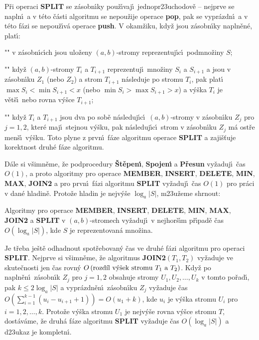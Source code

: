 \flushpar P\v ri operaci {\bf SPLIT} se z\'asobn\'\i ky pou\v z\'\i vaj\'\i\ 
jednopr\accent23uchodov\v e -- nejprve se napln\'\i\ a v t\'eto \v c\'asti 
algoritmu se nepou\v zije operace {\bf pop}, pak se vypr\'azdn\'\i\ a v t\'eto 
f\'azi se nepou\v z\'\i v\'a operace {\bf push}. V okam\v ziku, kdy\v z jsou 
z\'asobn\'\i ky napln\v en\'e, plat\'\i :
\roster
\item"{}"
v z\'asobn\'\i c\'\i ch jsou ulo\v zeny $\left(a,b\right)$-stromy reprezentuj\'\i c\'\i\ 
podmno\v ziny $S$;
\item"{}" 
kdy\v z $\left(a,b\right)$-stromy $T_i$ a $T_{i+1}$ reprezentuj\'\i\ mno\v ziny $S_
i$ a $S_{i+1}$ a jsou v z\'a\-sobn\'\i ku $Z_1$ (nebo $Z_2$) a strom $T_{i+1}$ n\'asleduje 
po stromu $T_{i}$, pak plat\'\i\ $\max S_i<\min S_{i+1}<x$ (nebo 
$\min S_i>\max S_{i+1}>x$) a v\'y\v ska $T_i$ je v\v et\v s\'\i\ nebo 
rovna v\'y\v sce $T_{i+1}$;
\item"{}"
kdy\v z $T_i$ a $T_{i+1}$ jsou dva po sob\v e n\'asleduj\'\i c\'\i\ $
\left(a,b\right)$-stromy v 
z\'asobn\'\i ku $Z_j$ pro $j=1,2$, kter\'e maj\'\i\ stejnou v\'y\v sku, pak 
n\'asleduj\'\i c\'\i\ strom v z\'asobn\'\i ku $Z_j$ m\'a ost\v re men\v s\'\i\ v\'y\v sku.
\endroster
\flushpar Toto plyne z prvn\'\i\ f\'aze algoritmu operace {\bf SPLIT} a zaji\v s\v tuje 
korektnost druh\'e f\'aze algoritmu. 
\medskip

\flushpar D\'ale si v\v simn\v eme, \v ze podprocedury {\bf \v St\v epen\'\i }, {\bf Spojen\'\i} a {\bf P\v re\-sun }
vy\v zaduj\'\i\ \v cas $O\left(1\right)$, a proto algoritmy pro operace {\bf MEMBER}, 
{\bf INSERT}, {\bf DELETE}, {\bf MIN}, {\bf MAX}, {\bf JOIN2} a pro prvn\'\i\ f\'azi algoritmu 
{\bf SPLIT} vy\v zaduj\'\i\ \v cas $O\left(1\right)$ pro pr\'aci v dan\'e hladin\v e.  Proto\v ze 
hladin je nejv\'y\v se $\log_a|S|$, m\accent23u\v zeme shrnout: 


Algoritmy pro operace {\bf MEMBER}, {\bf INSERT}, 
{\bf DE\-LETE}, {\bf MIN}, {\bf MAX}, {\bf JOIN2} a {\bf SPLIT} v $
\left(a,b\right)$-stromech vy\-\v zaduj\'\i\ 
v nejhor\v s\'\i m p\v r\'\i pad\v e \v cas $O\left(\log_a|S|\right)$, kde $
S$ je 
re\-pre\-zen\-tovan\'a mno\v zina.  
\endproclaim


\flushpar Je t\v reba je\v st\v e odhadnout spot\v rebovan\'y \v cas ve druh\'e f\'azi 
algoritmu pro operaci {\bf SPLIT}. Nejprve si v\v simn\v eme, \v ze 
algoritmus {\bf JOIN2$\left(T_1,T_2\right)$} vy\v zaduje ve skute\v cnosti jen \v cas 
rovn\'y 
$O\left(\text{\rm rozd\'\i l v\'y\v sek strom\accent23u }T_1\text{\rm \ a }
T_2\right)$. Kdy\v z po napln\v en\'\i\ 
z\'asobn\'\i k $Z_j$ pro $j=1,2$ obsahuje stromy $U_1,U_2,\dots,U_
k$ v tomto 
po\v rad\'\i , pak $k\le 2\log_a|S|$ a vypr\'azdn\v en\'\i\ z\'asobn\'\i ku $
Z_j$ 
vy\v zaduje 
\v cas $O\left(\sum_{i=1}^{k-1}\left(u_i-u_{i+1}+1\right)\right)=O\left(u_1+k\right)$, kde $u_i$ je v\'y\v ska stromu $
U_i$ pro 
$i=1,2,\dots,k$. Proto\v ze v\'y\v ska stromu $U_1$ je nejv\'y\v se rovna v\'y\v sce 
stromu $T$, dost\'av\'ame, \v ze druh\'a f\'aze algoritmu {\bf SPLIT} vy\v zaduje 
\v cas $O\left(\log_a|S|\right)$ a d\accent23ukaz je kompletn\'\i . 
\medskip

